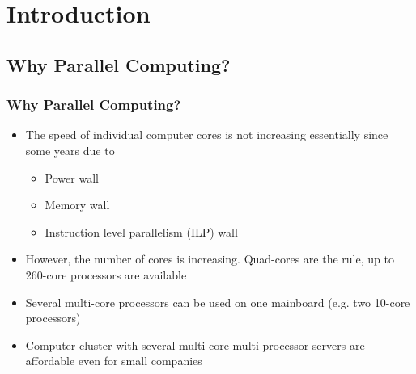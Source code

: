
\section{Introduction}

\subsection{Why Parallel Computing?}

\begin{frame}
\frametitle<presentation>{Why Parallel Computing?}

\begin{itemize}
\item The speed of individual computer cores is not increasing essentially since some years due to
\begin{itemize}
\item Power wall
\item Memory wall
\item Instruction level parallelism (ILP) wall 
\end{itemize}
\item However, the number of cores is increasing. Quad-cores are the rule, up to 260-core processors are available
\item Several multi-core processors can be used on one mainboard (e.g. two 10-core processors)
\item Computer cluster with several multi-core multi-processor servers are affordable even for small companies
\end{itemize}

\end{frame}


